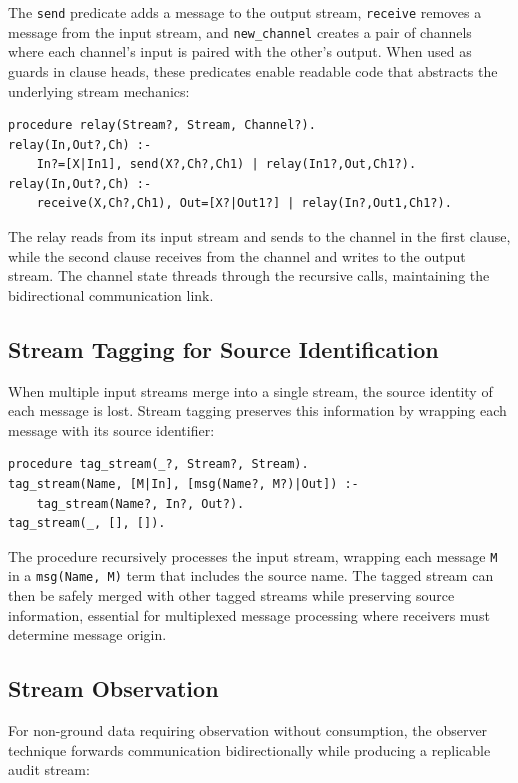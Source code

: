 The \verb|send| predicate adds a message to the output stream, \verb|receive| removes a message from the input stream, and \verb|new_channel| creates a pair of channels where each channel's input is paired with the other's output. When used as guards in clause heads, these predicates enable readable code that abstracts the underlying stream mechanics:

\label{program:relay}
\begin{verbatim}
procedure relay(Stream?, Stream, Channel?).
relay(In,Out?,Ch) :-
    In?=[X|In1], send(X?,Ch?,Ch1) | relay(In1?,Out,Ch1?).
relay(In,Out?,Ch) :-
    receive(X,Ch?,Ch1), Out=[X?|Out1?] | relay(In?,Out1,Ch1?).
\end{verbatim}

The relay reads from its input stream and sends to the channel in the first clause, while the second clause receives from the channel and writes to the output stream. The channel state threads through the recursive calls, maintaining the bidirectional communication link.

\subsection{Stream Tagging for Source Identification}

When multiple input streams merge into a single stream, the source identity of each message is lost. Stream tagging preserves this information by wrapping each message with its source identifier:

\label{program:tag-stream}
\begin{verbatim}
procedure tag_stream(_?, Stream?, Stream).
tag_stream(Name, [M|In], [msg(Name?, M?)|Out]) :-
    tag_stream(Name?, In?, Out?).
tag_stream(_, [], []).
\end{verbatim}

The procedure recursively processes the input stream, wrapping each message \verb|M| in a \verb|msg(Name, M)| term that includes the source name. The tagged stream can then be safely merged with other tagged streams while preserving source information, essential for multiplexed message processing where receivers must determine message origin.

\subsection{Stream Observation}

For non-ground data requiring observation without consumption, the observer technique forwards communication bidirectionally while producing a replicable audit stream:

